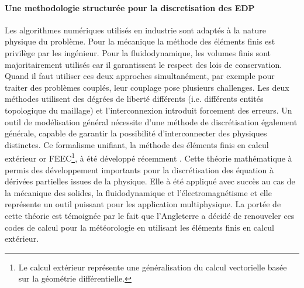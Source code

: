 \documentclass[12pt, french]{article}
\begin{document}
\paragraph{\large Une methodologie structurée pour la discretisation des EDP\\}
Les algorithmes numériques utilisés en industrie sont adaptés à la nature physique du problème. Pour la mécanique la méthode des éléments finis est privilège par les ingénieur. Pour la fluidodynamique, les volumes finis sont majoritairement utilisés car il garantissent le respect des lois de conservation. Quand il faut utiliser ces deux approches simultanément, par exemple pour traiter des problèmes couplés, leur couplage pose plusieurs challenges. Les deux méthodes utilisent des dégrées de liberté différents (i.e. différents entités topologique du maillage) et l'interconnexion introduit forcement des erreurs. Un outil de modélisation général nécessite d'une méthode de discrétisation également générale, capable de  garantir la possibilité d'interconnecter des physiques distinctes. Ce formalisme unifiant, la méthode des éléments finis en calcul extérieur or FEEC\footnote{Le calcul extérieur représente une généralisation du calcul vectorielle basée sur la géométrie différentielle.},  à été développé récemment \cite{arnold2006acta}. Cette théorie mathématique à permis des développement importants pour la discrétisation des équation à dérivées partielles issues de la physique. Elle à été appliqué avec succès au cas de la mécanique des solides, la fluidodynamique et l'électromagnétisme et elle représente un outil puissant pour les application multiphysique. La portée de cette théorie est témoignée par le fait que l'Angleterre a décidé de renouveler ces codes de calcul pour la météorologie en utilisant les éléments finis en calcul extérieur.
\end{document}
